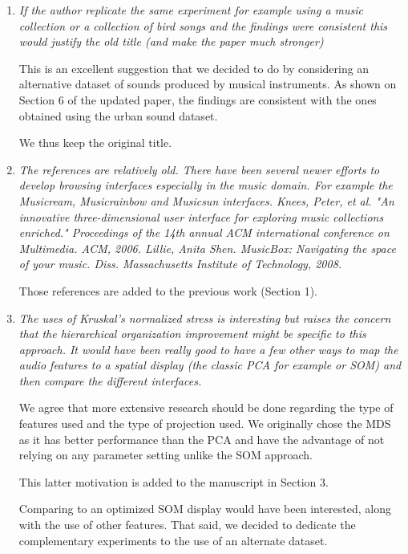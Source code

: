 \documentclass[10pt]{article}
\begin{document}
\begin{enumerate}

\item \emph{If the author replicate the same experiment for example using a music collection or a collection of bird songs and the findings were consistent 
this would justify the old title (and make the paper much stronger)}

This is an excellent suggestion that we decided to do by considering an alternative dataset of sounds produced by musical instruments. As shown on Section 6 of the updated paper, the findings are consistent with the ones obtained using the urban sound dataset.

We thus keep the original title.

\item \emph{The references are relatively old. There have been several newer efforts to develop browsing interfaces especially in the music domain. 
For example the Musicream, Musicrainbow and Musicsun interfaces. 
Knees, Peter, et al. "An innovative three-dimensional user interface for exploring music collections enriched." Proceedings of the 14th annual ACM international conference on Multimedia. ACM, 2006.
Lillie, Anita Shen. MusicBox: Navigating the space of your music. Diss. Massachusetts Institute of Technology, 2008.}

Those references are added to the previous work (Section 1).

\item \emph{The uses of Kruskal's normalized stress is interesting but raises the concern that the hierarchical organization improvement might be specific to this approach. It would have been 
really good to have a few other ways to map the audio features to a spatial display (the classic PCA for example or SOM) and then compare the different interfaces.}

We agree that more extensive research should be done regarding the type of features used and the type of projection used. We originally chose the MDS as it has better performance than the PCA and have the advantage of not relying on any parameter setting unlike the SOM approach. 

This latter motivation is added to the manuscript in Section 3. 

Comparing to an optimized SOM display would have been interested, along with the use of other features. That said, we decided to dedicate the complementary experiments to the use of an alternate dataset.


\end{enumerate}
\end{document}
